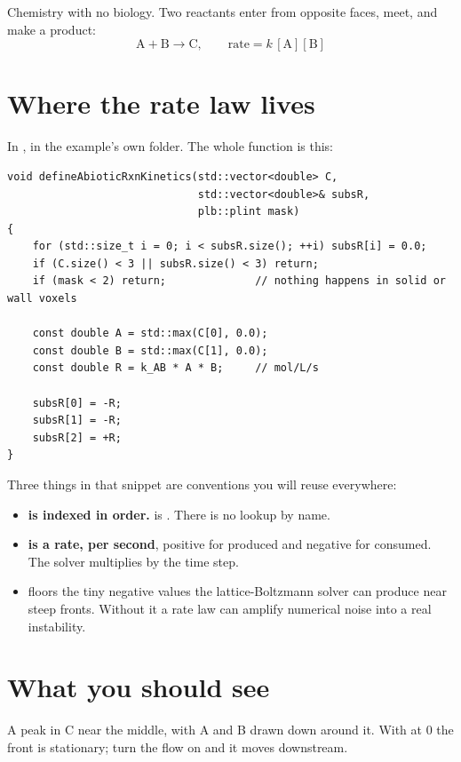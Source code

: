Chemistry with no biology. Two reactants enter from opposite faces, meet, and
make a product:
\[
  \mathrm{A} + \mathrm{B} \longrightarrow \mathrm{C},
  \qquad \text{rate} = k\,[\mathrm{A}][\mathrm{B}]
\]

\section{Where the rate law lives}

In , in the example's own folder. The whole
function is this:

\begin{lstlisting}[style=cpp]
void defineAbioticRxnKinetics(std::vector<double> C,
                              std::vector<double>& subsR,
                              plb::plint mask)
{
    for (std::size_t i = 0; i < subsR.size(); ++i) subsR[i] = 0.0;
    if (C.size() < 3 || subsR.size() < 3) return;
    if (mask < 2) return;              // nothing happens in solid or wall voxels

    const double A = std::max(C[0], 0.0);
    const double B = std::max(C[1], 0.0);
    const double R = k_AB * A * B;     // mol/L/s

    subsR[0] = -R;
    subsR[1] = -R;
    subsR[2] = +R;
}
\end{lstlisting}

Three things in that snippet are conventions you will reuse everywhere:

\begin{itemize}[leftmargin=1.2em]
\item \textbf{ is indexed in  order.}  is
. There is no lookup by name.
\item \textbf{ is a rate, per second}, positive for produced and
negative for consumed. The solver multiplies by the time step.
\item \textbf{} floors the tiny negative values the
lattice-Boltzmann solver can produce near steep fronts. Without it a rate law
can amplify numerical noise into a real instability.
\end{itemize}

\section{What you should see}

A peak in C near the middle, with A and B drawn down around it. With
 at 0 the front is stationary; turn the flow on and it moves
downstream.

